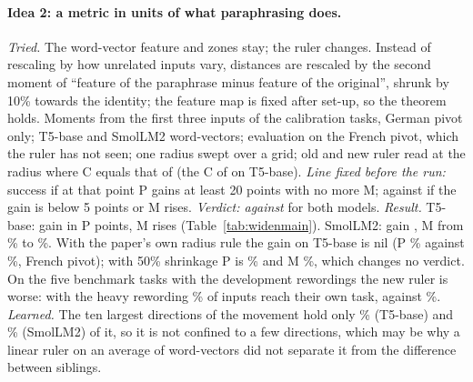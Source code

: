 \paragraph{Idea 2: a metric in units of what paraphrasing does.} \emph{Tried.} The word-vector feature and zones stay; the ruler changes. Instead of rescaling by how unrelated inputs vary, distances are rescaled by the second moment of ``feature of the paraphrase minus feature of the original'', shrunk by 10\% towards the identity; the feature map is fixed after set-up, so the theorem holds. Moments from the first three inputs of the \WidenTasksCal{} calibration tasks, German pivot only; T5-base and SmolLM2 word-vectors; evaluation on the French pivot, which the ruler has not seen; one radius swept over a grid; old and new ruler read at the radius where \textsf{C} equals that of \cert{} (the \textsf{C} of \cert{} on T5-base).
\emph{Line fixed before the run:} success if at that point \textsf{P} gains at least 20 points with no more \textsf{M}; against if the gain is below 5 points or \textsf{M} rises. \emph{Verdict: against} for both models.
\emph{Result.} T5-base: gain in \textsf{P} \WidenRulerTfiveGain{} points, \textsf{M} rises (Table~\ref{tab:widenmain}). SmolLM2: gain \WidenRulerSmolGain{}, \textsf{M} from \WidenRulerSmolMOld{}\% to \WidenRulerSmolMNew{}\%. With the paper's own radius rule the gain on T5-base is nil (\textsf{P} \WidenRulerTfiveRuleBOld{}\% against \WidenRulerTfiveRuleBNew{}\%, French pivot); with 50\% shrinkage \textsf{P} is \WidenRulerHalfP{}\% and \textsf{M} \WidenRulerHalfM{}\%, which changes no verdict. On the five benchmark tasks with the development rewordings the new ruler is worse: with the heavy rewording \WidenRulerHeavyNew{}\% of inputs reach their own task, against \WidenRulerHeavyOld{}\%.
\emph{Learned.} The ten largest directions of the movement hold only \WidenRulerTopTenTfive{}\% (T5-base) and \WidenRulerTopTenSmol{}\% (SmolLM2) of it, so it is not confined to a few directions, which may be why a linear ruler on an average of word-vectors did not separate it from the difference between siblings.

